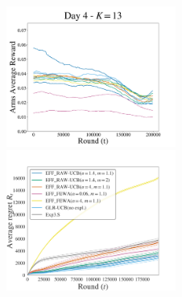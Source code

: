 \begin{figure}[p!]
\includegraphics[clip, width= 0.495\textwidth]{4Restless/fig/reward_plot_day4.pdf}
\includegraphics[clip, width= 0.495\textwidth]{4Restless/fig/DAY4.pdf}
\end{figure}


